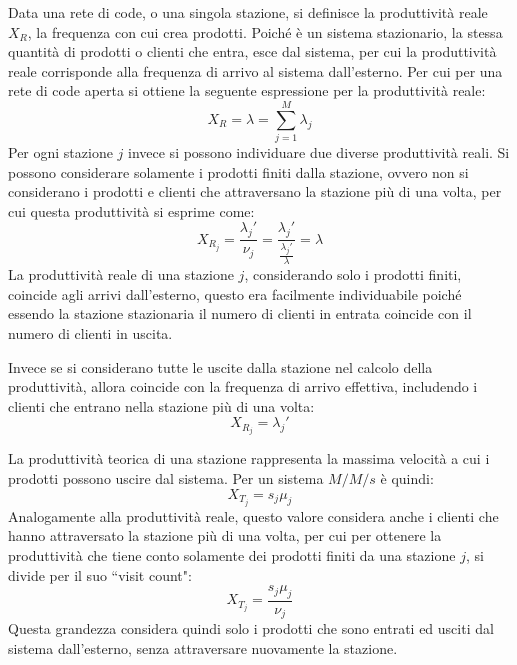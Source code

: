 \documentclass{article}
\numberwithin{equation}{subsection}
\begin{document}
Data una rete di code, o una singola stazione, si definisce la produttività reale $X_R$, la frequenza con cui crea prodotti. Poiché è un sistema stazionario, la stessa 
quantità di prodotti o clienti che entra, esce dal sistema, per cui la produttività reale corrisponde alla frequenza di arrivo al sistema dall'esterno. Per cui per una rete di 
code aperta si ottiene la seguente espressione per la produttività reale:
\begin{equation}
    X_R=\lambda=\displaystyle\sum_{j=1}^M\lambda_j
\end{equation}
Per ogni stazione $j$ invece si possono individuare due diverse produttività reali. Si possono considerare solamente i prodotti finiti dalla stazione, ovvero non si considerano 
i prodotti e clienti che attraversano la stazione più di una volta, per cui questa produttività si esprime come:
\begin{equation*}
    X_{R_j}=\displaystyle\frac{\lambda_j'}{\nu_j}=\frac{\lambda_j'}{\frac{\lambda_j'}{\lambda}}=\lambda
\end{equation*}
La produttività reale di una stazione $j$, considerando solo i prodotti finiti, coincide agli arrivi dall'esterno, questo era facilmente individuabile poiché essendo la 
stazione stazionaria il numero di clienti in entrata coincide con il numero di clienti in uscita. 

Invece se si considerano tutte le uscite dalla stazione nel calcolo della produttività, allora coincide con la frequenza di arrivo effettiva, includendo i clienti che 
entrano nella stazione più di una volta:
\begin{equation*}
    X_{R_j}=\lambda_j'
\end{equation*}

La produttività teorica di una stazione rappresenta la massima velocità a cui i prodotti possono uscire dal sistema. Per un sistema $M/M/s$ è quindi:
\begin{equation*}
    X_{T_j}=s_j\mu_j
\end{equation*}
Analogamente alla produttività reale, questo valore considera anche i clienti che hanno attraversato la stazione più di una volta, per cui per ottenere la produttività che 
tiene conto solamente dei prodotti finiti da una stazione $j$, si divide per il suo ``visit count":
\begin{equation*}
    X_{T_j}=\displaystyle\frac{s_j\mu_j}{\nu_j}
\end{equation*}
Questa grandezza considera quindi solo i prodotti che sono entrati ed usciti dal sistema dall'esterno, senza attraversare nuovamente la stazione. 
\end{document}
